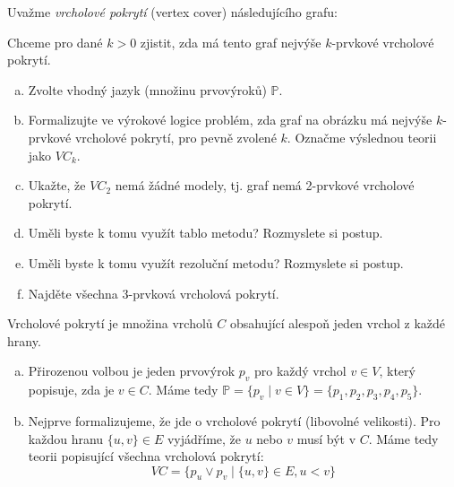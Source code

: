 \begin{problem}

    Uvažme \emph{vrcholové pokrytí} (vertex cover) následujícího grafu:    
    \begin{center}
    \end{center}
    Chceme pro dané $k>0$ zjistit, zda má tento graf nejvýše $k$-prvkové vrcholové pokrytí.

    \begin{enumerate}[(a)]
        \item Zvolte vhodný jazyk (množinu prvovýroků) $\mathbb P$.
        \item Formalizujte ve výrokové logice problém, zda graf na obrázku má nejvýše $k$-prvkové vrcholové pokrytí, pro pevně zvolené $k$. Označme výslednou teorii jako ${VC}_k$.
        \item Ukažte, že ${VC}_2$ nemá žádné modely, tj. graf nemá 2-prvkové vrcholové pokrytí.
        \item Uměli byste k tomu využít tablo metodu? Rozmyslete si postup.
        \item Uměli byste k tomu využít rezoluční metodu? Rozmyslete si postup.
        \item Najděte všechna 3-prvková vrcholová pokrytí.            
    \end{enumerate}

    \begin{solution}
        Vrcholové pokrytí je množina vrcholů $C$ obsahující alespoň jeden vrchol z každé hrany.
        \begin{enumerate}[(a)]
            \item Přirozenou volbou je jeden prvovýrok $p_v$ pro každý vrchol $v\in V$, který popisuje, zda je $v\in C$. Máme tedy $\mathbb P=\{p_v\mid v\in V\}=\{p_1,p_2,p_3,p_4,p_5\}$.
            \item Nejprve formalizujeme, že jde o vrcholové pokrytí (libovolné velikosti). Pro každou hranu $\{u,v\}\in E$ vyjádříme, že $u$ nebo $v$ musí být v $C$. Máme tedy teorii popisující všechna vrcholová pokrytí:
            $$
            VC=\{p_u\lor p_v\mid \{u,v\}\in E, u<v\}
            $$
            

\end{enumerate}
\end{solution}
\end{problem}
